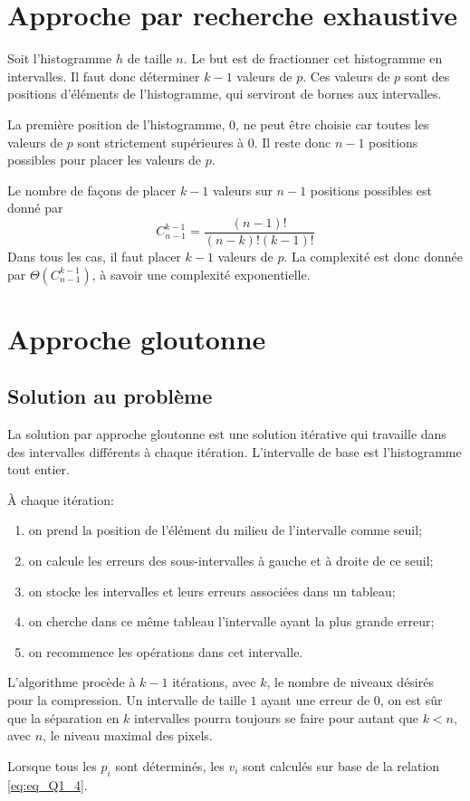 \documentclass[a4paper, 12pt]{article}
\begin{document}
    \section{Approche par recherche exhaustive}
    Soit l'histogramme \(h\) de taille \(n\). Le but est de fractionner cet histogramme en intervalles. Il faut donc déterminer \(k-1\) valeurs de \(p\). Ces valeurs de \(p\) sont des positions d'éléments de l'histogramme, qui serviront de bornes aux intervalles.\par
    La première position de l'histogramme, \(0\), ne peut être choisie car toutes les valeurs de \(p\) sont strictement supérieures à 0. Il reste donc \(n-1\) positions possibles pour placer les valeurs de \(p\).\par
	Le nombre de façons de placer \(k-1\) valeurs sur \(n-1\) positions possibles est donné par
	\begin{displaymath}
	    C_{n-1}^{k-1} = \dfrac{\left(n-1\right)!}{\left(n-k\right)!\left(k-1\right)!}
	\end{displaymath}
	Dans tous les cas, il faut placer \(k-1\) valeurs de \(p\). La complexité est donc donnée par \(\Theta\left(C_{n-1}^{k-1}\right)\), à savoir une complexité exponentielle.
	
	\section{Approche gloutonne}
	
	\subsection{Solution au problème}
	\label{subsec:subsec_greedy}
	La solution par approche gloutonne est une solution itérative qui travaille dans des intervalles différents à chaque itération. L'intervalle de base est l'histogramme tout entier.\par
	À chaque itération:
	\begin{enumerate}
	    \item on prend la position de l'élément du milieu de l'intervalle comme seuil;
	    \item on calcule les erreurs des sous-intervalles à gauche et à droite de ce seuil;
	    \item on stocke les intervalles et leurs erreurs associées dans un tableau;
	    \item on cherche dans ce même tableau l'intervalle ayant la plus grande erreur;
	    \item on recommence les opérations dans cet intervalle.
	\end{enumerate}
	L'algorithme procède à \(k-1\) itérations, avec \(k\), le nombre de niveaux désirés pour la compression. Un intervalle de taille \(1\) ayant une erreur de 0, on est sûr que la séparation en \(k\) intervalles pourra toujours se faire pour autant que \(k < n\), avec \(n\), le niveau maximal des pixels.\par
	Lorsque tous les \(p_i\) sont déterminés, les \(v_i\) sont calculés sur base de la relation \eqref{eq:eq_Q1_4}.
	
\end{document}
